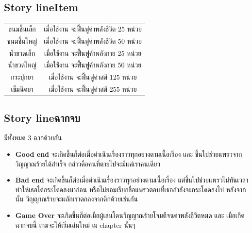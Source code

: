 \subsection{\ifenglish Story line\else Item\fi }
\begin{center}
    \begin{tabular}{|c|c|}
    \hline
    ขนมชิ้นเล็ก & เมื่อใช้งาน จะฟื้นฟูค่าพลังชีวิต 25 หน่วย\\
    ขนมชิ้นใหญ่ & เมื่อใช้งาน จะฟื้นฟูค่าพลังชีวิต 50 หน่วย\\
    น้ำขวดเล็ก & เมื่อใช้งาน จะฟื้นฟูค้าพลังกาย 25 หน่วย\\
    น้ำขวดใหญ่ & เมื่อใช้งาน จะฟื้นฟูค้าพลังกาย 50 หน่วย\\
    กระปุกยา & เมื่อใช้งาน จะฟื้นฟูค่าสติ 125 หน่วย\\
    เข็มฉีดยา & เมื่อใช้งาน จะฟื้นฟูค่าสติ 255 หน่วย\\
    \hline
    \end{tabular}
\end{center}
\subsection{\ifenglish Story line\else ฉากจบ\fi }
มีทั้งหมด 3 ฉากด้วยกัน
\begin{itemize}
    \item \textbf{Good end} จะเกิดขึ้นก็ต่อเมื่อดำเนินเรื่องราวทุกอย่างตามเนื้อเรื่อง และ ขึ้นไปช่วยแพรวจากวิญญาณร้ายได้สำเร็จ กล่าวคือคนที่ตายไปจะมีแค่เราคนเดียว
    \item \textbf{Bad end} จะเกิดขึ้นก็ต่อเมื่อดำเนินเรื่องราวทุกอย่างตามเนื้อเรื่อง แต่ขึ้นไปช่วยแพรวไม่ทันเวลา ทำให้เธอได้กระโดดลงมาก่อน หรือไม่ยอมเรียกชื่อแพรวตอนที่เธอกำลังจะกระโดดลงไป หลังจากนั้น วิญญาณร้ายจะผลักเราตกลงจากตึกด้วยเช่นกัน
    \item \textbf{Game Over} จะเกิดขึ้นก็ต่อเมื่อผู้เล่นโดนวิญญาณร้ายโจมตีจนค่าพลังชีวิตหมด และ เมื่อเกิดฉากจบนี้ เกมจะให้เริ่มเล่นใหม่ ณ chapter นั้นๆ
\end{itemize}


